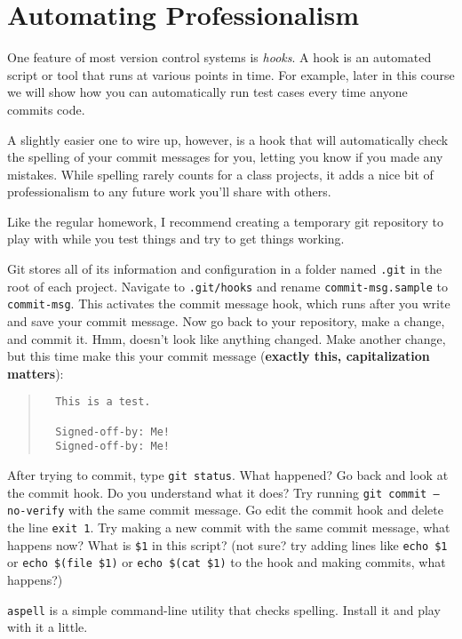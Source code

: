 \documentclass{article}
\begin{document}
\newpage
\section{Automating Professionalism}

One feature of most version control systems is \emph{hooks}. A hook is an
automated script or tool that runs at various points in time. For example,
later in this course we will show how you can automatically run test cases
every time anyone commits code.

\medskip
\noindent
A slightly easier one to wire up, however, is a hook that will automatically
check the spelling of your commit messages for you, letting you know if you
made any mistakes. While spelling rarely counts for a class projects, it
adds a nice bit of professionalism to any future work you'll share with
others.

\medskip
\noindent
Like the regular homework, I recommend creating a temporary git repository to
play with while you test things and try to get things working.

\medskip
\noindent
Git stores all of its information and configuration in a folder named
\texttt{.git} in the root of each project. Navigate to \texttt{.git/hooks} and
rename \texttt{commit-msg.sample} to \texttt{commit-msg}. This activates the
commit message hook, which runs after you write and save your commit message.
Now go back to your repository, make a change, and commit it. Hmm, doesn't
look like anything changed. Make another change, but this time make this your
commit message (\textbf{exactly this, capitalization matters}):
\begin{quote}
  \begin{verbatim}
  This is a test.

  Signed-off-by: Me!
  Signed-off-by: Me!\end{verbatim}
\end{quote}
After trying to commit, type \texttt{git status}. What happened? Go back and
look at the commit hook. Do you understand what it does? Try running
\texttt{git commit --no-verify} with the same commit message. Go edit the
commit hook and delete the line \texttt{exit 1}. Try making a new commit with
the same commit message, what happens now? What is \texttt{\$1} in this
script?  (not sure? try adding lines like \texttt{echo~\$1} or
\texttt{echo~\$(file~\$1)} or \texttt{echo~\$(cat~\$1)} to the hook and making
commits, what happens?)

\medskip
\noindent
\texttt{aspell} is a simple command-line utility that checks spelling. Install
it and play with it a little.
\end{document}
